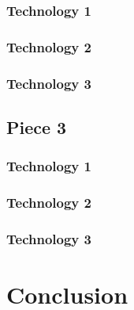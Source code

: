 \documentclass[letterpaper,10pt,titlepage,draftclsnofoot,onecolumn,onesided] {IEEEtran}
\begin{document}
\subsubsection{Technology 1}
\subsubsection{Technology 2}
\subsubsection{Technology 3}

\subsection{Piece 3}
\subsubsection{Technology 1}
\subsubsection{Technology 2}
\subsubsection{Technology 3}

\section{Conclusion}



\end{document}
